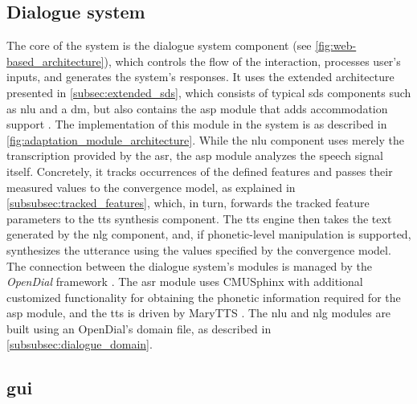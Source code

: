\subsection{Dialogue system}
\label{subsec:dialogue_system}

The core of the system is the dialogue system component (see \cref{fig:web-based_architecture}), which controls the flow of the interaction, processes user's inputs, and generates the system's responses.
It uses the extended architecture presented in \cref{subsec:extended_sds}, which consists of typical \ac{sds} components such as \ac{nlu} and a \ac{dm}, but also contains the \ac{asp} module that adds accommodation support \citep{Raveh2017SemDial}.
The implementation of this module in the system is as described in \cref{fig:adaptation_module_architecture}.
While the \ac{nlu} component uses merely the transcription provided by the \ac{asr}, the \ac{asp} module analyzes the speech signal itself.
Concretely, it tracks occurrences of the defined features and passes their measured values to the convergence model, as explained in \cref{subsubsec:tracked_features}, which, in turn, forwards the tracked feature parameters to the \ac{tts} synthesis component.
The \ac{tts} engine then takes the text generated by the \ac{nlg} component, and, if phonetic-level manipulation is supported, synthesizes the utterance using the values specified by the convergence model.
The connection between the dialogue system's modules is managed by the \emph{OpenDial} framework \citep{Lison2016opendial, Lison2015developing}.
The \ac{asr} module uses CMUSphinx \citep{Lamere2003sphinx} with additional customized functionality for obtaining the phonetic information required for the \ac{asp} module, and the \ac{tts} is driven by MaryTTS \citep{LeMaguer2017uprooted, Schroeder2003mary}.
The \ac{nlu} and \ac{nlg} modules are built using an OpenDial's domain file, as described in \cref{subsubsec:dialogue_domain}.

\subsection{\Acl{gui}}
\label{subsec:graphical_user_interface}

